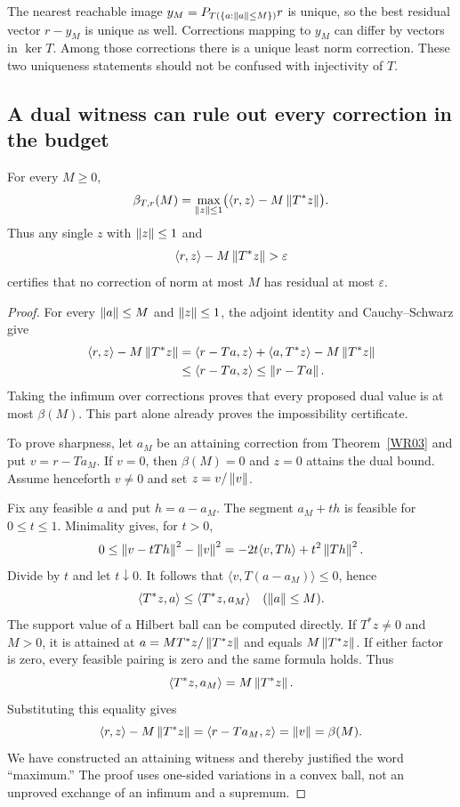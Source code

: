 The nearest reachable image $y_M=P_{T(\{a:\left\lVert a\right\rVert\le M\})}r$ is unique, so the best residual vector $r-y_M$ is unique as well. Corrections mapping to $y_M$ can differ by vectors in $\ker T$. Among those corrections there is a unique least norm correction. These two uniqueness statements should not be confused with injectivity of $T$.

\subsection{A dual witness can rule out every correction in the budget}
\begin{theorem}\label{WR04}
For every $M\ge0$,
\begin{equation}\label{eq:budget-dual}
 \beta_{T,r}(M)=
 \max_{\left\lVert z\right\rVert\le1}\bigl(\langle r,z\rangle-M\left\lVert T^*z\right\rVert\bigr).
\end{equation}
Thus any single $z$ with $\left\lVert z\right\rVert\le1$ and
\[
 \langle r,z\rangle-M\left\lVert T^*z\right\rVert>\varepsilon
\]
certifies that no correction of norm at most $M$ has residual at most $\varepsilon$.
\end{theorem}
\begin{proof}
For every $\left\lVert a\right\rVert\le M$ and $\left\lVert z\right\rVert\le1$, the adjoint identity and Cauchy--Schwarz give
\[
\begin{aligned}
 \langle r,z\rangle-M\left\lVert T^*z\right\rVert
 &=\langle r-Ta,z\rangle+\langle a,T^*z\rangle-M\left\lVert T^*z\right\rVert\\
 &\le\langle r-Ta,z\rangle
 \le\left\lVert r-Ta\right\rVert.
\end{aligned}
\]
Taking the infimum over corrections proves that every proposed dual value is at most $\beta(M)$. This part alone already proves the impossibility certificate.

To prove sharpness, let $a_M$ be an attaining correction from Theorem~\ref{WR03} and put $v=r-Ta_M$. If $v=0$, then $\beta(M)=0$ and $z=0$ attains the dual bound. Assume henceforth $v\ne0$ and set $z=v/\left\lVert v\right\rVert$.

Fix any feasible $a$ and put $h=a-a_M$. The segment $a_M+th$ is feasible for $0\le t\le1$. Minimality gives, for $t>0$,
\[
 0\le\left\lVert v-tTh\right\rVert^2-\left\lVert v\right\rVert^2
   =-2t\langle v,Th\rangle+t^2\left\lVert Th\right\rVert^2.
\]
Divide by $t$ and let $t\downarrow0$. It follows that $\langle v,T(a-a_M)\rangle\le0$, hence
\[
 \langle T^*z,a\rangle\le\langle T^*z,a_M\rangle
 \quad(\left\lVert a\right\rVert\le M).
\]
The support value of a Hilbert ball can be computed directly. If $T^*z\ne0$ and $M>0$, it is attained at $a=M T^*z/\left\lVert T^*z\right\rVert$ and equals $M\left\lVert T^*z\right\rVert$. If either factor is zero, every feasible pairing is zero and the same formula holds. Thus
\[
 \langle T^*z,a_M\rangle=M\left\lVert T^*z\right\rVert.
\]
Substituting this equality gives
\[
 \langle r,z\rangle-M\left\lVert T^*z\right\rVert
 =\langle r-Ta_M,z\rangle=\left\lVert v\right\rVert=\beta(M).
\]
We have constructed an attaining witness and thereby justified the word ``maximum.'' The proof uses one-sided variations in a convex ball, not an unproved exchange of an infimum and a supremum.
\end{proof}

